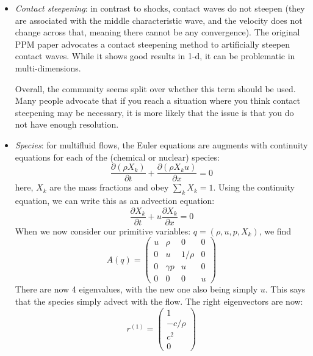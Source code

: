 \documentclass[11pt]{article}
\begin{document}
\begin{itemize}
\item {\em Contact steepening}: in contrast to shocks, contact waves
  do not steepen (they are associated with the middle characteristic
  wave, and the velocity does not change across that, meaning there
  cannot be any convergence).  The original PPM
  paper advocates a contact steepening method to artificially steepen
  contact waves.  While it shows good results in 1-d, it can be
  problematic in multi-dimensions.  

  Overall, the community seems split over whether this term should be
  used.  Many people advocate that if you reach a situation where you
  think contact steepening may be necessary, it is more likely that
  the issue is that you do not have enough resolution.

\item {\em Species}: for multifluid flows, the Euler equations are
augments with continuity equations for each of the (chemical or nuclear)
species:
\begin{equation}
\frac{\partial (\rho X_k)}{\partial t} + \frac{\partial (\rho X_k u)}{\partial x} = 0
\end{equation}
here, $X_k$ are the mass fractions and obey $\sum_k X_k = 1$.  Using the
continuity equation, we can write this as an advection equation:
\begin{equation}
\frac{\partial X_k}{\partial t} + u \frac{\partial X_k}{\partial x} = 0
\end{equation}
When we now consider our primitive variables: $q = (\rho, u, p, X_k)$,
we find
\begin{equation}
A(q) = \left ( \begin{array}{cccc} u  & \rho     & 0      &  0\\
                                  0  &  u       & 1/\rho &  0\\
                                  0  & \gamma p & u      &  0\\
                                  0  & 0        & 0      & u \end{array} \right )
\end{equation}
There are now 4 eigenvalues, with the new one also being simply $u$.
This says that the species simply advect with the flow.  The right
eigenvectors are now:
\begin{equation}
r^{(1)} = \left ( \begin{array}{c} 1 \\ -c/\rho \\ c^2 \\ 0\end{array} \right )

\end{equation}
\end{itemize}
\end{document}
